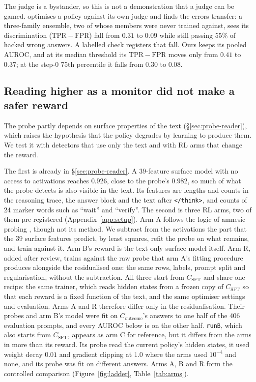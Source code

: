 \documentclass{article}
\begin{document}
The judge is a bystander, so this is not a demonstration that a judge can be gamed. \citet{zhou2026convincing} optimises a policy against its own judge and finds the errors transfer: a three-family ensemble, two of whose members were never trained against, sees its discrimination ($\mathrm{TPR}-\mathrm{FPR}$) fall from $0.31$ to $0.09$ while still passing $55\%$ of hacked wrong answers. A labelled check registers that fall. Ours keeps its pooled AUROC, and at its median threshold its $\mathrm{TPR}-\mathrm{FPR}$ moves only from $0.41$ to $0.37$; at the step-0 $75$th percentile it falls from $0.30$ to $0.08$.

\subsection{Reading higher as a monitor did not make a safer reward}\label{sec:surface}

The probe partly depends on surface properties of the text (\S\ref{sec:probe-reader}), which raises the hypothesis that the policy degrades by learning to produce them. We test it with detectors that use only the text and with RL arms that change the reward.

The first is already in \S\ref{sec:probe-reader}. A 39-feature surface model with no access to activations reaches $0.926$, close to the probe's $0.982$, so much of what the probe detects is also visible in the text. Its features are lengths and counts in the reasoning trace, the answer block and the text after \texttt{</think>}, and counts of 24 marker words such as ``wait'' and ``verify''. The second is three RL arms, two of them pre-registered (Appendix~\ref{app:setup}). Arm A follows the logic of amnesic probing \citep{elazar2021amnesic}, though not its method. We subtract from the activations the part that the 39 surface features predict, by least squares, refit the probe on what remains, and train against it. Arm B's reward is the text-only surface model itself. Arm R, added after review, trains against the raw probe that arm A's fitting procedure produces alongside the residualised one: the same rows, labels, prompt split and regularisation, without the subtraction. All three start from $C_{\text{SFT}}$ and share one recipe: the same trainer, which reads hidden states from a frozen copy of $C_{\text{SFT}}$ so that each reward is a fixed function of the text, and the same optimiser settings and evaluation. Arms A and R therefore differ only in the residualisation. Their probes and arm B's model were fit on $C_{\text{outcome}}$'s answers to one half of the 406 evaluation prompts, and every AUROC below is on the other half. \texttt{runB}, which also starts from $C_{\text{SFT}}$, appears as arm C for reference, but it differs from the arms in more than its reward. Its probe read the current policy's hidden states, it used weight decay $0.01$ and gradient clipping at $1.0$ where the arms used $10^{-4}$ and none, and its probe was fit on different answers. Arms A, B and R form the controlled comparison (Figure~\ref{fig:ladder}, Table~\ref{tab:arms}).
\end{document}
